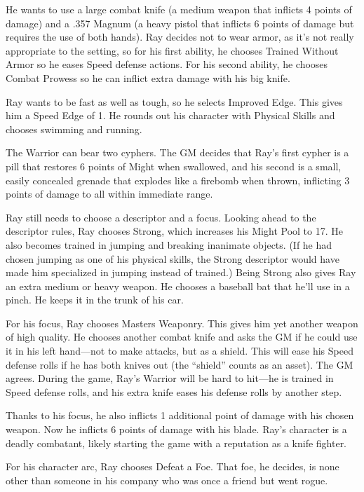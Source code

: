\begin{multicols}{2}
He wants to use a large combat knife (a medium weapon that inflicts 4 points of damage) and a .357 Magnum (a heavy pistol that inflicts 6 points of damage but requires the use of both hands). Ray decides not to wear armor, as it’s not really appropriate to the setting, so for his first ability, he chooses Trained Without Armor so he eases Speed defense actions. For his second ability, he chooses Combat Prowess so he can inflict extra damage with his big knife. 

Ray wants to be fast as well as tough, so he selects Improved Edge. This gives him a Speed Edge of 1. He rounds out his character with Physical Skills and chooses swimming and running.

The Warrior can bear two cyphers. The GM decides that Ray’s first cypher is a pill that restores 6 points of Might when swallowed, and his second is a small, easily concealed grenade that explodes like a firebomb when thrown, inflicting 3 points of damage to all within immediate range. 

Ray still needs to choose a descriptor and a focus. Looking ahead to the descriptor rules, Ray chooses Strong, which increases his Might Pool to 17. He also becomes trained in jumping and breaking inanimate objects. (If he had chosen jumping as one of his physical skills, the Strong descriptor would have made him specialized in jumping instead of trained.) Being Strong also gives Ray an extra medium or heavy weapon. He chooses a baseball bat that he’ll use in a pinch. He keeps it in the trunk of his car.

For his focus, Ray chooses Masters Weaponry. This gives him yet another weapon of high quality. He chooses another combat knife and asks the GM if he could use it in his left hand—not to make attacks, but as a shield. This will ease his Speed defense rolls if he has both knives out (the “shield” counts as an asset). The GM agrees. During the game, Ray’s Warrior will be hard to hit—he is trained in Speed defense rolls, and his extra knife eases his defense rolls by another step.

Thanks to his focus, he also inflicts 1 additional point of damage with his chosen weapon. Now he inflicts 6 points of damage with his blade. Ray’s character is a deadly combatant, likely starting the game with a reputation as a knife fighter.

For his character arc, Ray chooses Defeat a Foe. That foe, he decides, is none other than someone in his company who was once a friend but went rogue.


\end{multicols}

